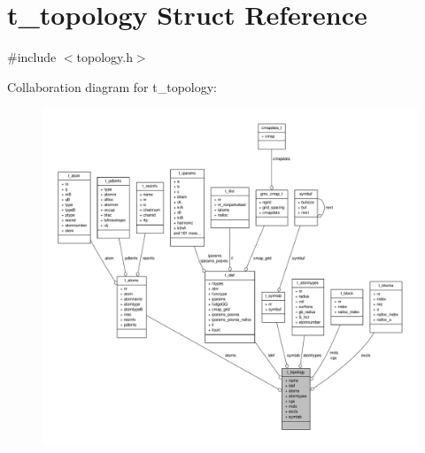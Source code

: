 \hypertarget{structt__topology}{\section{t\-\_\-topology \-Struct \-Reference}
\label{structt__topology}
}


{\ttfamily \#include $<$topology.\-h$>$}



\-Collaboration diagram for t\-\_\-topology\-:
\nopagebreak
\begin{figure}[H]
\begin{center}
\leavevmode
\includegraphics[width=350pt]{structt__topology__coll__graph}
\end{center}
\end{figure}
